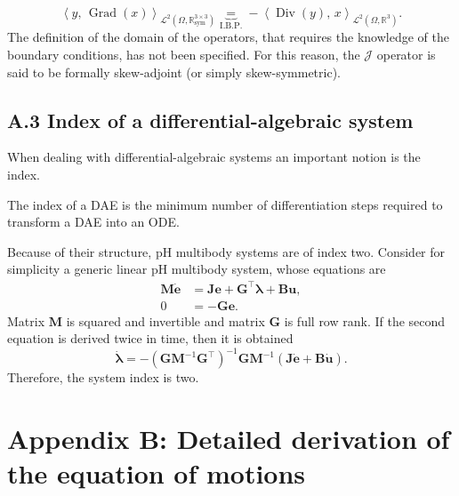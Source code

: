 \documentclass{svjour3}                     %
\DeclareMathOperator*{\Grad}{Grad}
\DeclareMathOperator*{\Div}{Div}
\begin{document}
	\begin{equation*}
	\left\langle y, \, \Grad(x) \right\rangle_{\mathscr{L}^2(\Omega, \mathbb{R}^{3\times 3}_{\text{sym}})} 
	\underbrace{=}_{\text{I.B.P.}} -\left\langle\Div(y), \, x \right\rangle_{\mathscr{L}^2(\Omega, \mathbb{R}^3)}.
	\end{equation*}
	The definition of the domain of the operators, that requires the knowledge of the boundary conditions, has not been specified. For this reason, the $\bm{\mathcal{J}}$ operator is said to be formally skew-adjoint (or simply skew-symmetric).
	
	\subsection*{\normalsize \textbf{A.3 Index of a differential-algebraic system}}
	When dealing with differential-algebraic systems an important notion is the index.
	\begin{definition}
		The index of a DAE is the minimum number of differentiation steps required to transform a DAE into an ODE.
	\end{definition}
	Because of their structure, pH multibody systems are of index two. Consider for simplicity a generic linear pH multibody system, whose equations are
	\begin{equation*}
	\begin{aligned}
	\mathbf{M} \dot{\mathbf{e}} &=  \mathbf{J}\mathbf{e} + \mathbf{G}^\top \bm{\lambda} + \mathbf{B}\mathbf{u}, \\ 
	0 &= -\mathbf{G}\mathbf{e}.
	\end{aligned}
	\end{equation*}
	Matrix $\mathbf{M}$ is squared and invertible and matrix $\mathbf{G}$ is full row rank. If the second equation is derived twice in time, then it is obtained
	\[\dot{\bm{\lambda}} = - (\mathbf{G} \mathbf{M}^{-1} \mathbf{G}^\top)^{-1} \mathbf{G} \mathbf{M}^{-1} (\mathbf{J} \dot{\mathbf{e}} + \mathbf{B}\dot{\mathbf{u}}).
	\]
	Therefore, the system index is two.  
	\section*{Appendix B: Detailed derivation of the equation of motions}
	
\end{document}
